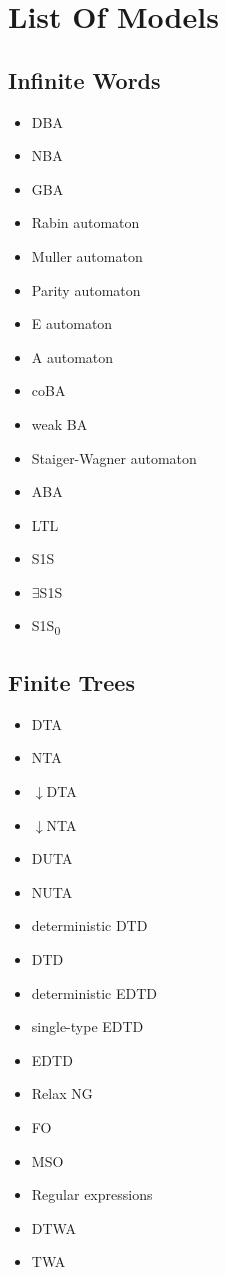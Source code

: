 \documentclass{article}
\begin{document}
\section{List Of Models}
\subsection{Infinite Words}
\begin{itemize}
	\item DBA
	\item NBA
	\item GBA
	\item Rabin automaton
	\item Muller automaton
	\item Parity automaton
	\item E automaton
	\item A automaton
	\item coBA
	\item weak BA
	\item Staiger-Wagner automaton
	\item ABA
	\item LTL
	\item S1S
	\item $\exists$S1S
	\item S1S\textsubscript{0}
\end{itemize}

\subsection{Finite Trees}
\begin{itemize}
	\item DTA
	\item NTA
	\item $\downarrow$DTA
	\item $\downarrow$NTA
	\item DUTA
	\item NUTA
	\item deterministic DTD
	\item DTD
	\item deterministic EDTD
	\item single-type EDTD
	\item EDTD
	\item Relax NG
	\item FO
	\item MSO
	\item Regular expressions
	\item DTWA
	\item TWA
\end{itemize}
\end{document}
